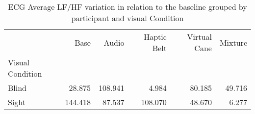 
\begin{table}[!htb]
\centering
\caption{ECG Average LF/HF variation in relation to the baseline grouped by participant and visual Condition}
\label{tab:ecg_lfhf_variation_group}
\begin{tabular}{lrrrrr}
\toprule
{} &    Base &   Audio &  Haptic Belt &  Virtual Cane &  Mixture \\
Visual Condition &         &         &              &               &          \\
\midrule
Blind            &  28.875 & 108.941 &        4.984 &        80.185 &   49.716 \\
Sight            & 144.418 &  87.537 &      108.070 &        48.670 &    6.277 \\
\bottomrule
\end{tabular}
\end{table}

